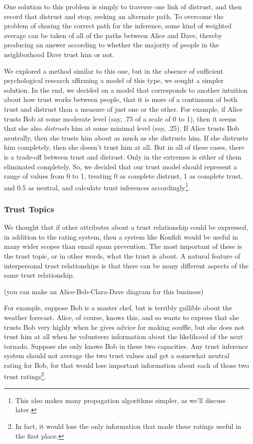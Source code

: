 \documentclass{acm_proc_article-sp}
\begin{document}
One solution to this problem is simply to traverse one link of distrust, and then record that distrust and stop, seeking an alternate path.  To overcome the problem of chosing the correct path for the inference, some kind of weighted average can be taken of all of the paths between Alice and Dave, thereby producing an answer according to whether the majority of people in the neighborhood Dave trust him or not.

We explored a method similar to this one, but in the absence of sufficient psychological research affirming a model of this type, we sought a simpler solution.  In the end, we decided on a model that corresponds to another intuition about how trust works between people, that it is more of a continuum of both trust and distrust than a measure of just one or the other.  For example, if Alice trusts Bob at some moderate level (say, .75 of a scale of 0 to 1), then it seems that she also \textit{distrusts} him at some minimal level (say, .25).  If Alice trusts Bob neutrally, then she trusts him about as much as she distrusts him.  If she distrusts him completely, then she doesn't trust him at all.  But in all of these cases, there is a trade-off between trust and distrust.  Only in the extremes is either of them eliminated completely.  So, we decided that our trust model should represent a range of values from 0 to 1, treating 0 as complete distrust, 1 as complete trust, and 0.5 as neutral, and calculate trust inferences accordingly\footnote{This also makes many propagation algorithms simpler, as we'll discuss later.}.

\subsubsection{Trust Topics}
We thought that if other attributes about a trust relationship could be expressed, in addition to the rating system, then a system like Konfidi would be useful in many wider scopes than email spam prevention.  The most important of these is the trust topic, or in other words, what the trust is about.  A natural feature of interpersonal trust relationships is that there can be many different aspects of the same trust relationship.  

(you can make an Alice-Bob-Clara-Dave diagram for this business)

For example, suppose Bob is a master chef, but is terribly gullible about the weather forecast.  Alice, of course, knows this, and so wants to express that she trusts Bob very highly when he gives advice for making souffle, but she does not trust him at all when he volunteers information about the likelihood of the next tornado.  Suppose she only knows Bob in these two capacities.  Any trust inference system should not average the two trust values and get a somewhat neutral rating for Bob, for that would lose important information about each of those two trust ratings\footnote{In fact, it would lose the only information that made these ratings useful in the first place.}.
\end{document}
